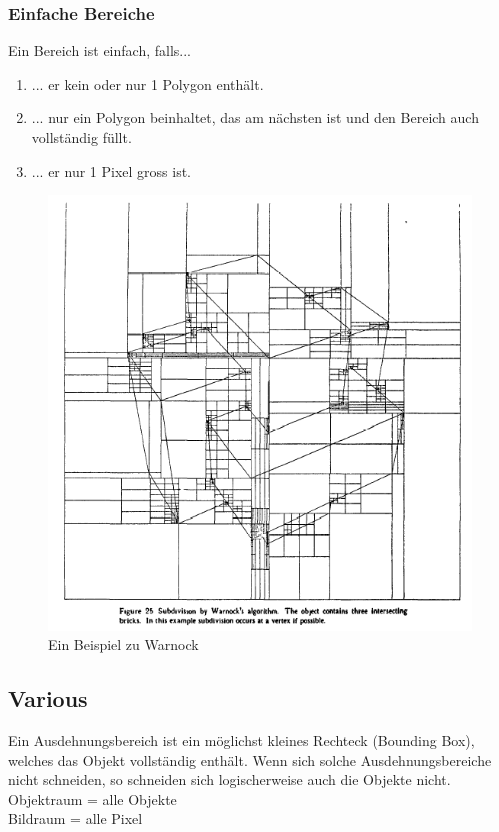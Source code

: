 \subsubsection{Einfache Bereiche}
Ein Bereich ist einfach, falls...
\begin{enumerate}
	\item ... er kein oder nur 1 Polygon enthält.
	\item ... nur ein Polygon beinhaltet, das am nächsten ist und den Bereich auch vollständig füllt.
	\item ... er nur 1 Pixel gross ist.
\end{enumerate}
\begin{figure}[!ht]
	\centering
	\includegraphics[width=0.5\linewidth]{fig/warnock}
	\caption{Ein Beispiel zu Warnock}
	\label{fig:warnock}
\end{figure}
\subsection{Various}
Ein Ausdehnungsbereich ist ein möglichst kleines Rechteck (Bounding Box), welches das Objekt vollständig enthält. Wenn sich solche Ausdehnungsbereiche nicht schneiden, so schneiden sich logischerweise auch die Objekte nicht.\\
Objektraum = alle Objekte\\
Bildraum = alle Pixel